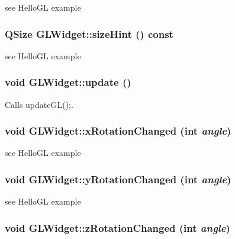 see HelloGL example \hypertarget{class_g_l_widget_a57698bc426052845b43a135a13540154}{
\subsubsection[{sizeHint}]{\setlength{\rightskip}{0pt plus 5cm}QSize GLWidget::sizeHint () const}}
\label{class_g_l_widget_a57698bc426052845b43a135a13540154}


see HelloGL example \hypertarget{class_g_l_widget_a6c9d382ddf46097bccb2b69410f7563e}{
\subsubsection[{update}]{\setlength{\rightskip}{0pt plus 5cm}void GLWidget::update ()}}
\label{class_g_l_widget_a6c9d382ddf46097bccb2b69410f7563e}


Calls updateGL();. \hypertarget{class_g_l_widget_a3a557b9cd96f7b89661ceaa567c91640}{
\subsubsection[{xRotationChanged}]{\setlength{\rightskip}{0pt plus 5cm}void GLWidget::xRotationChanged (int {\em angle})}}
\label{class_g_l_widget_a3a557b9cd96f7b89661ceaa567c91640}


see HelloGL example \hypertarget{class_g_l_widget_ad47d672d0124b995e82551a95b59badb}{
\subsubsection[{yRotationChanged}]{\setlength{\rightskip}{0pt plus 5cm}void GLWidget::yRotationChanged (int {\em angle})}}
\label{class_g_l_widget_ad47d672d0124b995e82551a95b59badb}


see HelloGL example \hypertarget{class_g_l_widget_ab2035753b19b46105020d6045ac75a79}{
\subsubsection[{zRotationChanged}]{\setlength{\rightskip}{0pt plus 5cm}void GLWidget::zRotationChanged (int {\em angle})}}
\label{class_g_l_widget_ab2035753b19b46105020d6045ac75a79}



